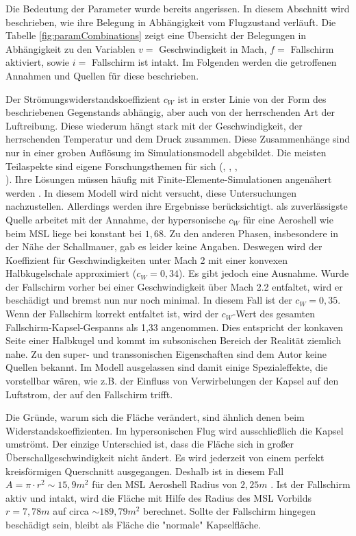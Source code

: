 Die Bedeutung der Parameter wurde bereits angerissen. In diesem Abschnitt wird beschrieben, wie ihre Belegung in Abhängigkeit vom Flugzustand verläuft. Die Tabelle \ref{fig:paramCombinations} zeigt eine Übersicht der Belegungen in Abhängigkeit zu den Variablen $v = $ Geschwindigkeit in Mach, $f =$ Fallschirm aktiviert, sowie $i =$ Fallschirm ist intakt. Im Folgenden werden die getroffenen Annahmen und Quellen für diese beschrieben.



Der Strömungswiderstandskoeffizient $c_W$ ist in erster Linie von der Form des beschriebenen Gegenstands abhängig, aber auch von der herrschenden Art der Luftreibung. Diese wiederum hängt stark mit der Geschwindigkeit, der herrschenden Temperatur und dem Druck zusammen. Diese Zusammenhänge sind nur in einer groben Auflösung im Simulationsmodell abgebildet. Die meisten Teilaspekte sind eigene Forschungsthemen für sich (\cite{Blanchard1980}, \cite{Edquist2009}, \cite{Theisinger2009},\\ \cite{Yamada2009}). Ihre Lösungen müssen häufig mit Finite-Elemente-Simulationen angenähert werden \cite{Edquist2009}. In diesem Modell wird nicht versucht, diese Untersuchungen nachzustellen. Allerdings werden ihre Ergebnisse berücksichtigt. \cite{Wells2000} als zuverlässigste Quelle arbeitet mit der Annahme, der hypersonische $c_W$ für eine Aeroshell wie beim MSL liege bei konstant bei $1,68$. Zu den anderen Phasen, insbesondere in der Nähe der Schallmauer, gab es leider keine Angaben. Deswegen wird der Koeffizient für Geschwindigkeiten unter Mach 2 mit einer konvexen Halbkugelschale approximiert ($c_W = 0,34$). Es gibt jedoch eine Ausnahme. Wurde der Fallschirm vorher bei einer Geschwindigkeit über Mach 2.2 \cite{Way2007} \cite{Edquist2009} entfaltet, wird er beschädigt und bremst nun nur noch minimal. In diesem Fall ist der $c_W = 0,35$. Wenn der Fallschirm korrekt entfaltet ist, wird der $c_W$-Wert des gesamten Fallschirm-Kapsel-Gespanns als 1,33 angenommen. Dies entspricht der konkaven Seite einer Halbkugel und kommt im subsonischen Bereich der Realität ziemlich nahe. Zu den super- und transsonischen Eigenschaften sind dem Autor keine Quellen bekannt. Im Modell ausgelassen sind damit einige Spezialeffekte, die vorstellbar wären, wie z.B. der Einfluss von Verwirbelungen der Kapsel auf den Luftstrom, der auf den Fallschirm trifft.

Die Gründe, warum sich die Fläche verändert, sind ähnlich denen beim Widerstandskoeffizienten. Im hypersonischen Flug wird ausschließlich die Kapsel umströmt. Der einzige Unterschied ist, dass die Fläche sich in großer Über\-schall\-ge\-schwin\-dig\-keit nicht ändert. Es wird jederzeit von einem perfekt kreisförmigen Querschnitt ausgegangen. Deshalb ist in diesem Fall $ A = \pi \cdot r^2 \sim 15,9m^2$ für den MSL Aeroshell Radius von $2,25m$ \cite{Edquist2009}. Ist der Fallschirm aktiv und intakt, wird die Fläche mit Hilfe des Radius des MSL Vorbilds $ r = 7,78m $ \cite{NASA/JPL2009} auf circa $\sim 189,79m^2$ berechnet. Sollte der Fallschirm hingegen beschädigt sein, bleibt als Fläche die "normale" Kapselfläche.

